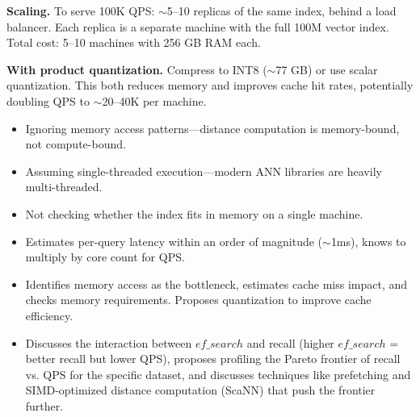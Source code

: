 \begin{interviewq}
\textbf{Scaling.} To serve 100K QPS: $\sim$5--10 replicas of the same index, behind a load balancer. Each replica is a separate machine with the full 100M vector index. Total cost: 5--10 machines with 256 GB RAM each.

\textbf{With product quantization.} Compress to INT8 ($\sim$77 GB) or use scalar quantization. This both reduces memory and improves cache hit rates, potentially doubling QPS to $\sim$20--40K per machine.

\redflags
\begin{itemize}
    \item Ignoring memory access patterns---distance computation is memory-bound, not compute-bound.
    \item Assuming single-threaded execution---modern ANN libraries are heavily multi-threaded.
    \item Not checking whether the index fits in memory on a single machine.
\end{itemize}


\goodgreat
\begin{itemize}
    \item {} Estimates per-query latency within an order of magnitude ($\sim$1ms), knows to multiply by core count for QPS.
    \item {} Identifies memory access as the bottleneck, estimates cache miss impact, and checks memory requirements. Proposes quantization to improve cache efficiency.
    \item {} Discusses the interaction between $ef\_search$ and recall (higher $ef\_search$ = better recall but lower QPS), proposes profiling the Pareto frontier of recall vs. QPS for the specific dataset, and discusses techniques like prefetching and SIMD-optimized distance computation (ScaNN) that push the frontier further.
\end{itemize}

\end{interviewq}


